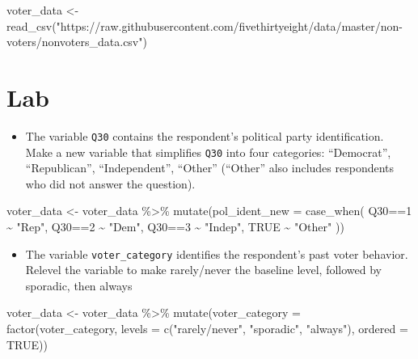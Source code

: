 \documentclass[
  letterpaper,
  DIV=11,
  numbers=noendperiod]{scrartcl}
\newenvironment{Shaded}{\begin{snugshade}}{\end{snugshade}}
\newcommand{\AttributeTok}[1]{\textcolor[rgb]{0.40,0.45,0.13}{#1}}
\newcommand{\ConstantTok}[1]{\textcolor[rgb]{0.56,0.35,0.01}{#1}}
\newcommand{\DecValTok}[1]{\textcolor[rgb]{0.68,0.00,0.00}{#1}}
\newcommand{\FunctionTok}[1]{\textcolor[rgb]{0.28,0.35,0.67}{#1}}
\newcommand{\NormalTok}[1]{\textcolor[rgb]{0.00,0.23,0.31}{#1}}
\newcommand{\OtherTok}[1]{\textcolor[rgb]{0.00,0.23,0.31}{#1}}
\newcommand{\SpecialCharTok}[1]{\textcolor[rgb]{0.37,0.37,0.37}{#1}}
\newcommand{\StringTok}[1]{\textcolor[rgb]{0.13,0.47,0.30}{#1}}
\providecommand{\tightlist}{%
  \setlength{\itemsep}{0pt}\setlength{\parskip}{0pt}}\usepackage{longtable,booktabs,array}
\begin{document}
\begin{Shaded}
\begin{Highlighting}[]
\NormalTok{voter\_data }\OtherTok{\textless{}{-}} \FunctionTok{read\_csv}\NormalTok{(}\StringTok{"https://raw.githubusercontent.com/fivethirtyeight/data/master/non{-}voters/nonvoters\_data.csv"}\NormalTok{)}
\end{Highlighting}
\end{Shaded}

\section{Lab}\label{lab}

\begin{itemize}
\tightlist
\item
  The variable \texttt{Q30} contains the respondent's political party
  identification. Make a new variable that simplifies \texttt{Q30} into
  four categories: ``Democrat'', ``Republican'', ``Independent'',
  ``Other'' (``Other'' also includes respondents who did not answer the
  question).
\end{itemize}

\begin{Shaded}
\begin{Highlighting}[]
\NormalTok{voter\_data }\OtherTok{\textless{}{-}}\NormalTok{ voter\_data }\SpecialCharTok{\%\textgreater{}\%}
  \FunctionTok{mutate}\NormalTok{(}\AttributeTok{pol\_ident\_new =} \FunctionTok{case\_when}\NormalTok{(}
\NormalTok{    Q30}\SpecialCharTok{==}\DecValTok{1} \SpecialCharTok{\textasciitilde{}} \StringTok{"Rep"}\NormalTok{, }
\NormalTok{    Q30}\SpecialCharTok{==}\DecValTok{2} \SpecialCharTok{\textasciitilde{}} \StringTok{"Dem"}\NormalTok{, }
\NormalTok{    Q30}\SpecialCharTok{==}\DecValTok{3} \SpecialCharTok{\textasciitilde{}} \StringTok{"Indep"}\NormalTok{, }
    \ConstantTok{TRUE} \SpecialCharTok{\textasciitilde{}} \StringTok{"Other"}
\NormalTok{  ))}
\end{Highlighting}
\end{Shaded}

\begin{itemize}
\tightlist
\item
  The variable \texttt{voter\_category} identifies the respondent's past
  voter behavior. Relevel the variable to make rarely/never the baseline
  level, followed by sporadic, then always
\end{itemize}

\begin{Shaded}
\begin{Highlighting}[]
\NormalTok{voter\_data }\OtherTok{\textless{}{-}}\NormalTok{ voter\_data }\SpecialCharTok{\%\textgreater{}\%}
  \FunctionTok{mutate}\NormalTok{(}\AttributeTok{voter\_category =} \FunctionTok{factor}\NormalTok{(voter\_category,}
                           \AttributeTok{levels =} \FunctionTok{c}\NormalTok{(}\StringTok{"rarely/never"}\NormalTok{, }\StringTok{"sporadic"}\NormalTok{, }\StringTok{"always"}\NormalTok{),}
                           \AttributeTok{ordered =} \ConstantTok{TRUE}\NormalTok{))}
\end{Highlighting}
\end{Shaded}
\end{document}
